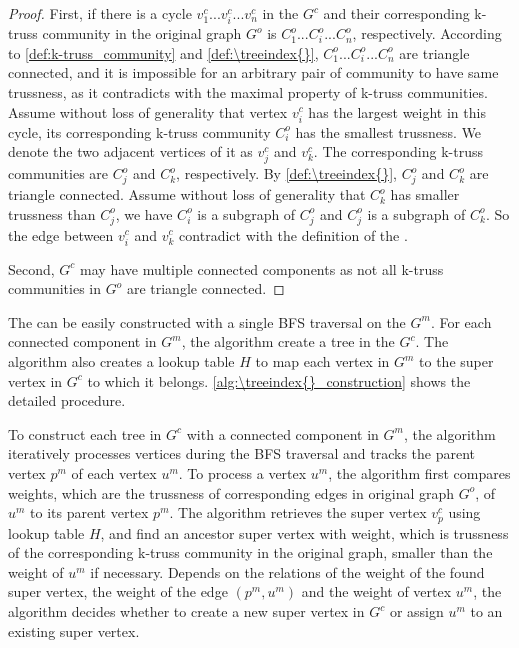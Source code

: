 \begin{proof}
First, if there is a cycle $v^{c}_{1} ... v^{c}_{i} ... v^{c}_{n}$ in the \treeindex{} $G^c$ and their corresponding k-truss community in the original graph $G^o$ is $C^{o}_{1} ... C^{o}_{i} ... C^{o}_{n}$, respectively. According to \autoref{def:k-truss_community} and \autoref{def:\treeindex{}}, $C^{o}_{1} ... C^{o}_{i} ... C^{o}_{n}$ are triangle connected, and it is impossible for an arbitrary pair of community to have same trussness, as it contradicts with the maximal property of k-truss communities. Assume without loss of generality that vertex $v^{c}_{i}$ has the largest weight in this cycle, \ie its corresponding k-truss community $C^{o}_{i}$ has the smallest trussness. We denote the two adjacent vertices of it as $v^{c}_{j}$ and $v^{c}_{k}$. The corresponding k-truss communities are $C^{o}_{j}$ and $C^{o}_{k}$, respectively. By \autoref{def:\treeindex{}}, $C^{o}_{j}$ and $C^{o}_{k}$ are triangle connected. Assume without loss of generality that $C^{o}_{k}$ has smaller trussness than $C^{o}_{j}$, we have $C^{o}_{i}$ is a subgraph of $C^{o}_{j}$ and $C^{o}_{j}$ is a subgraph of $C^{o}_{k}$. So the edge between $v^{c}_{i}$ and $v^{c}_{k}$ contradict with the definition of the \treeindex{}.

Second, $G^c$ may have multiple connected components as not all k-truss communities in $G^o$ are triangle connected. 
\end{proof}

The \treeindex{} can be easily constructed with a single BFS traversal on the \inducedgraph{} $G^m$. For each connected component in $G^m$, the algorithm create a tree in the \treeindex{} $G^c$. The algorithm also creates a lookup table $H$ to map each vertex in $G^m$ to the super vertex in $G^c$ to which it belongs. \autoref{alg:\treeindex{}_construction} shows the detailed procedure. %

To construct each tree in $G^c$ with a connected component in $G^m$, the algorithm iteratively processes vertices during the BFS traversal and tracks the parent vertex $p^m$ of each vertex $u^m$.
To process a vertex $u^m$, the algorithm first compares weights, which are the trussness of corresponding edges in original graph $G^o$, of $u^m$ to its parent vertex $p^m$. The algorithm retrieves the super vertex $v^{c}_{p}$ using lookup table $H$, and find an ancestor super vertex with weight, which is trussness of the corresponding k-truss community in the original graph, smaller than the weight of $u^m$ if necessary. Depends on the relations of the weight of the found super vertex, the weight of the edge $(p^m, u^m)$ and the weight of vertex $u^m$, the algorithm decides whether to create a new super vertex in $G^c$ or assign $u^m$ to an existing super vertex.

